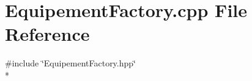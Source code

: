 \section{Equipement\-Factory.\-cpp File Reference}
\label{_equipement_factory_8cpp}
{\ttfamily \#include \char`\"{}Equipement\-Factory.\-hpp\char`\"{}}\\*

